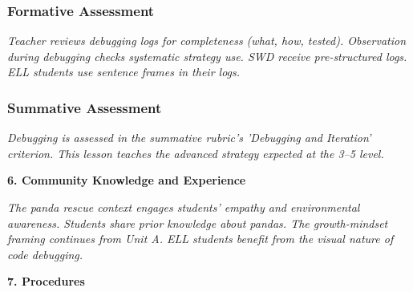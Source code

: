 \documentclass[11pt,letterpaper]{article}
\begin{document}
\subsubsection{Formative Assessment}

\textit{Teacher reviews debugging logs for completeness (what, how, tested). Observation during debugging checks systematic strategy use. SWD receive pre-structured logs. ELL students use sentence frames in their logs.}

\subsubsection{Summative Assessment}

\textit{Debugging is assessed in the summative rubric's 'Debugging and Iteration' criterion. This lesson teaches the advanced strategy expected at the 3--5 level.}

\textbf{6. Community Knowledge and Experience}

\textit{The panda rescue context engages students' empathy and environmental awareness. Students share prior knowledge about pandas. The growth-mindset framing continues from Unit A. ELL students benefit from the visual nature of code debugging.}

\textbf{7. Procedures}
\end{document}
